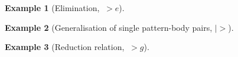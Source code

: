 \documentclass[a4paper, oneside, draft]{memoir}
\theoremstyle{definition}
\newtheorem{example}{Example}
\begin{document}
\begin{example}[Elimination, $~>e$]

\end{example}


\begin{example}[Generalisation of single pattern-body pairs, $|>$]

\end{example}


\begin{example}[Reduction relation, $~>g$]

\end{example}
\end{document}
